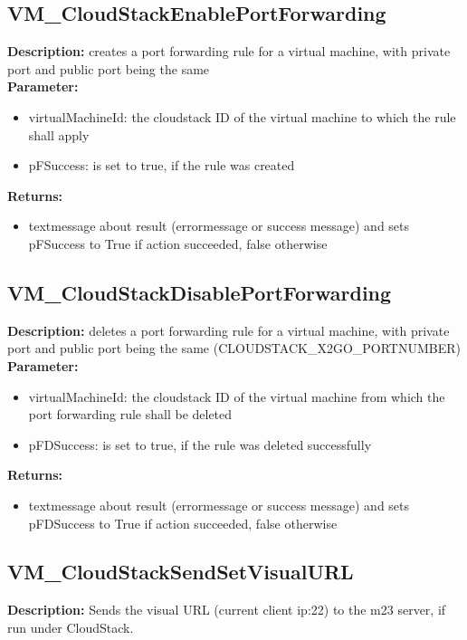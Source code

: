 \subsection{VM\_CloudStackEnablePortForwarding}
\textbf{Description:} creates a port forwarding rule for a virtual machine, with private port and public port being the same\\
\textbf{Parameter:}
\begin{itemize}
\item virtualMachineId: the cloudstack ID of the virtual machine to which the rule shall apply
\item pFSuccess: is set to true, if the rule was created
\end{itemize}
\textbf{Returns:}
\begin{itemize}
\item textmessage about result (errormessage or success message) and sets pFSuccess to True if action succeeded, false otherwise
\end{itemize}

\subsection{VM\_CloudStackDisablePortForwarding}
\textbf{Description:} deletes a port forwarding rule for a virtual machine, with private port and public port being the same (CLOUDSTACK\_X2GO\_PORTNUMBER)\\
\textbf{Parameter:}
\begin{itemize}
\item virtualMachineId: the cloudstack ID of the virtual machine from which the port forwarding rule shall be deleted
\item pFDSuccess: is set to true, if the rule was deleted successfully
\end{itemize}
\textbf{Returns:}
\begin{itemize}
\item textmessage about result (errormessage or success message) and sets pFDSuccess to True if action succeeded, false otherwise
\end{itemize}

\subsection{VM\_CloudStackSendSetVisualURL}
\textbf{Description:} Sends the visual URL (current client ip:22) to the m23 server, if run under CloudStack.\\

